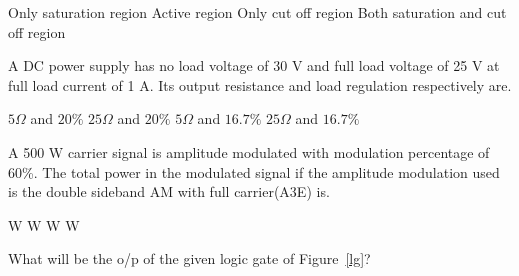\documentclass[a4, 11pt, addpoints]{exam}
\begin{document}
\begin{questions}
\begin{oneparchoices}
\choice Only saturation region
\choice Active region
\choice Only cut off region
\choice Both saturation and cut off region
\end{oneparchoices}  
\question A DC power supply has no load voltage of 30 V and full load voltage of 25 V at full load current of 1 A. Its output resistance and load regulation respectively are. \\[0.3cm]
\begin{oneparchoices}
\choice $5 \Omega$ and $20 \%$ 
\choice $25 \Omega$ and $20 \%$
\choice $5 \Omega$ and $ 16.7 \%$
\choice $25 \Omega$ and $16.7 \%$
\end{oneparchoices} 
\question A 500 W carrier signal is amplitude modulated with modulation percentage of 60\%.  The total power in the modulated signal if the amplitude modulation used is  the double sideband AM with full carrier(A3E) is. \\[0.3cm]
 \begin{oneparchoices}
 W
 W
 W
 W
\end{oneparchoices} 
\question What will be the o/p of the given logic gate of Figure~\ref{lg}?
\begin{figure}[H]
\centering
{}
\end{figure}
\end{questions}
\end{document}
